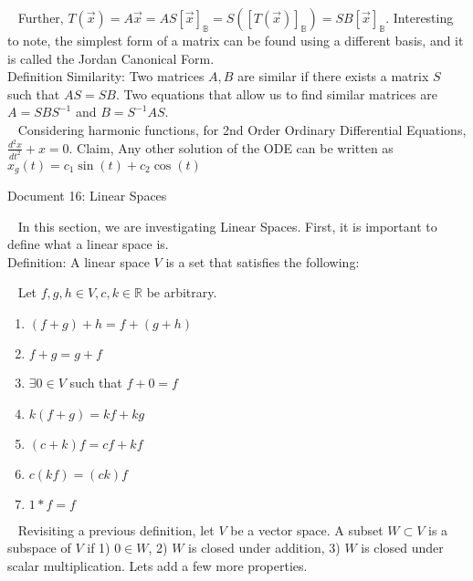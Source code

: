 \documentclass[12pt]{article}
\begin{document}
$\,\,\,$ Further, $T(\vec{x})=A\vec{x}=AS[\vec{x}]_\mathbb{B}=S([T(\vec{x})]_\mathbb{B})=SB[\vec{x}]_\mathbb{B}$. Interesting to note, the simplest form of a matrix can be found using a different basis, and it is called the Jordan Canonical Form.\\

Definition Similarity: Two matrices $A,B$ are similar if there exists a matrix $S$ such that $AS=SB$. Two equations that allow us to find similar matrices are $A=SBS^{-1}$ and $B=S^{-1}AS$.\\

$\,\,\,$ Considering harmonic functions, for 2nd Order Ordinary Differential Equations, $\frac{d^2x}{dt^2}+x=0$. Claim, Any other solution of the ODE can be written as $x_g(t)=c_1\sin(t)+c_2\cos(t)$

\newpage
\begin{center}
Document 16: Linear Spaces\\
\end{center}

\setlength{\leftskip}{0 in}
$\,\,\,$ In this section, we are investigating Linear Spaces. First, it is important to define what a linear space is.\\

Definition: A linear space $V$ is a set that satisfies the following:

$\,\,\,$ Let $f,g,h\in V,c,k\in\mathbb{R}$ be arbitrary.
\begin{enumerate}
\item $(f+g)+h=f+(g+h)$
\item $f+g=g+f$
\item $\exists 0\in V$ such that $f+0=f$
\item $k(f+g)=kf+kg$
\item $(c+k)f=cf+kf$
\item $c(kf)=(ck)f$
\item $1*f=f$
\end{enumerate}

$\,\,\,$ Revisiting a previous definition, let $V$ be a vector space. A subset $W\subset V$ is a subspace of $V$ if 1) $0\in W$, 2) $W$ is closed under addition, 3) $W$ is closed under scalar multiplication. Lets add a few more properties.\\
\end{document}
